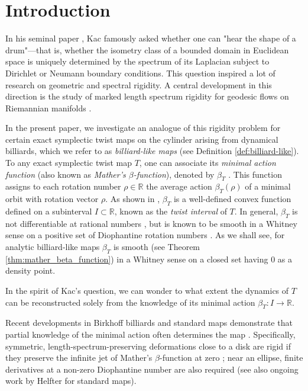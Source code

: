 \documentclass[10pt]{article}
\begin{document}
\section{Introduction}

In his seminal paper \cite{Kac}, Kac famously asked whether one can "hear the shape of a drum"—that is, whether the isometry class of a bounded domain in Euclidean space is uniquely determined by the spectrum of its Laplacian subject to Dirichlet or Neumann boundary conditions. This question inspired a lot of research on geometric and spectral rigidity. A central development in this direction is the study of marked length spectrum rigidity for geodesic flows on Riemannian manifolds \cite{Croke, CS, dMM, Otal}.

In the present paper, we investigate an analogue of this rigidity problem for certain exact symplectic twist maps on the cylinder arising from dynamical billiards, which we refer to as \textit{billiard-like maps} (see Definition \ref{def:billiard-like}). 
To any exact symplectic twist map $T$, one can associate its \textit{minimal action function} (also known as \textit{Mather's $\beta$-function}), denoted by $\beta_T$ \cite{Mather90, Siburg}. This function assigns to each rotation number $\rho \in \mathbb{R}$ the average action $\beta_T(\rho)$ of a minimal orbit with rotation vector $\rho$. As shown in \cite{Siburg}, $\beta_T$ is a well-defined convex function defined on a subinterval $I \subset \mathbb{R}$, known as the \textit{twist interval} of $T$. In general, $\beta_T$ is not differentiable at rational numbers \cite{Mather90}, but is known to be smooth in a Whitney sense on a positive set of Diophantine rotation numbers \cite{Popov}. As we shall see, for analytic billiard-like maps $\beta_T$ is smooth (see Theorem \ref{thm:mather_beta_function}) in a Whitney sense on a closed set having $0$ as a density point.

In the spirit of Kac's question, we can wonder to what extent the dynamics of $T$ can be reconstructed solely from the knowledge of its minimal action $\beta_T: I \to \mathbb{R}$.

\medskip
Recent developments in Birkhoff billiards and standard maps demonstrate that partial knowledge of the minimal action often determines the map \cite{DKW, FierobeSorrentinoVig, BBS, FKS_ellipse}. Specifically, symmetric, length-spectrum-preserving deformations close to a disk are rigid if they preserve the infinite jet of Mather's $\beta$-function at zero \cite{DKW}; near an ellipse, finite derivatives at a non-zero Diophantine number are also required \cite{FierobeSorrentinoVig} (see also ongoing work by Helfter for standard maps).
\end{document}
